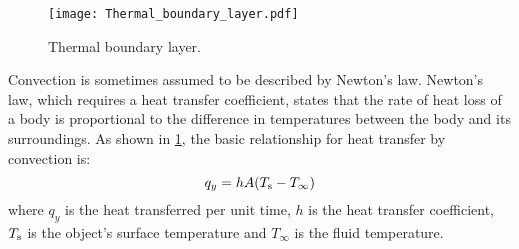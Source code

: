 \begin{figure}[!htp]
	\centering
	\texttt{[image: Thermal\_boundary\_layer.pdf]}
	\caption{Thermal boundary layer.}
	\label{Thermal_boundary_layer}
\end{figure}

Convection is sometimes assumed to be described by Newton's law.
Newton's law, which requires a heat transfer coefficient, states that the rate of heat loss of a body is proportional to the difference in temperatures between the body and its surroundings. %
As shown in \ref{Thermal_boundary_layer}, the basic relationship for heat transfer by convection is:
    \begin{equation}
    q_y=hA(T_{\rm{s}}-T_{\infty})
    \end{equation}
where $q_y$ is the heat transferred per unit time, $h$ is the heat transfer coefficient, $T_{\rm{s}}$ is the object's surface temperature and $T_{\infty}$ is the fluid temperature.



